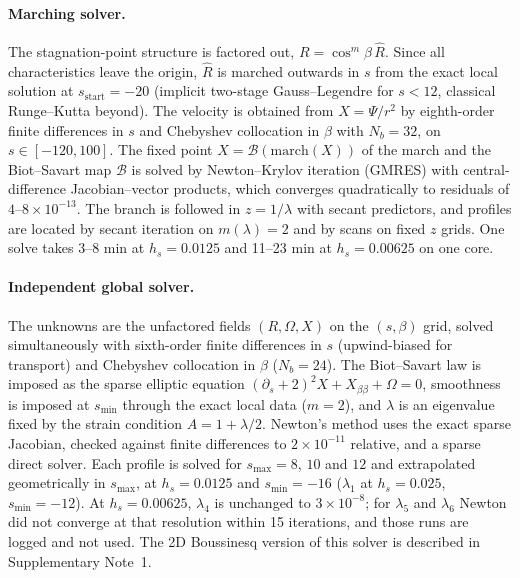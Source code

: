 \documentclass[11pt]{article}
\newcommand{\sstart}{s_{\mathrm{start}}}
\newcommand{\smax}{s_{\max}}
\begin{document}
\paragraph{Marching solver.} The stagnation-point structure is factored out, $R=\cos^m\!\beta\,\hat R$. Since all
characteristics leave the origin, $\hat R$ is marched outwards in $s$ from the exact local solution at $\sstart=-20$
(implicit two-stage Gauss--Legendre for $s<12$, classical Runge--Kutta beyond)\cite{hairer1993,hairer1996}. The
velocity is obtained from $X=\Psi/r^2$ by eighth-order finite differences in $s$\cite{fornberg1988} and Chebyshev
collocation in $\beta$\cite{trefethen2000} with $N_b=32$, on $s\in[-120,100]$. The fixed point $X=\mathcal{B}(\mathrm{march}(X))$
of the march and the Biot--Savart map $\mathcal{B}$ is solved by Newton--Krylov iteration (GMRES\cite{saad1986}) with
central-difference Jacobian--vector products, which converges quadratically to residuals of $4$--$8\times10^{-13}$.
The branch is followed in $z=1/\lambda$ with secant predictors, and profiles are located by secant iteration on
$m(\lambda)=2$ and by scans on fixed $z$ grids. One solve takes 3--8 min at $h_s=0.0125$ and 11--23 min at
$h_s=0.00625$ on one core.

\paragraph{Independent global solver.} The unknowns are the unfactored fields $(R,\Omega,X)$ on the $(s,\beta)$ grid,
solved simultaneously with sixth-order finite differences in $s$ (upwind-biased for transport) and Chebyshev
collocation in $\beta$ ($N_b=24$). The Biot--Savart law is imposed as the sparse elliptic equation
$(\partial_s+2)^2X+X_{\beta\beta}+\Omega=0$, smoothness is imposed at $s_{\min}$ through the exact local data ($m=2$),
and $\lambda$ is an eigenvalue fixed by the strain condition $A=1+\lambda/2$. Newton's method uses the exact sparse
Jacobian, checked against finite differences to $2\times10^{-11}$ relative, and a sparse direct
solver\cite{li2005}. Each profile is solved for $\smax=8$, $10$ and $12$ and extrapolated geometrically in $\smax$,
at $h_s=0.0125$ and $s_{\min}=-16$ ($\lambda_1$ at $h_s=0.025$, $s_{\min}=-12$). At $h_s=0.00625$, $\lambda_4$ is
unchanged to $3\times10^{-8}$; for $\lambda_5$ and $\lambda_6$ Newton did not converge at that resolution within 15
iterations, and those runs are logged and not used. The 2D Boussinesq version of this solver is described in
Supplementary Note~1.
\end{document}
